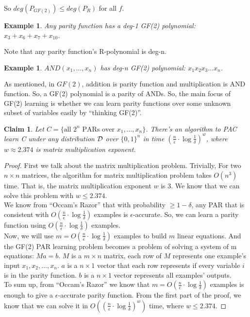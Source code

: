 \documentclass[12pt]{article}
\newtheorem{claim}[theorem]{Claim}
\newtheorem{example}[theorem]{Example}
\newcommand{\cald}{{\cal D}}
\begin{document}
So $deg(P_{GF(2)}) \le deg(P_R)$ for all $f$. \\

\begin{example}
Any parity function has a deg-1 GF(2) polynomial: $ x_3 + x_6 + x_7 +
x_{10}$.
\end{example}

Note that any parity function's R-polynomial is deg-n. 

\begin{example}
$AND(x_1,...,x_n)$ has deg-n GF(2) polynomial: $x_1x_2x_3...x_n$.
\end{example}

As mentioned, in $GF(2)$, addition is parity function and
multiplication is AND function. So, a GF(2) polynomial is a parity of
ANDs. So, the main focus of GF(2) learning is whether we can 
learn parity functions over some unknown subset of variables easily by
``thinking GF(2)''.

\begin{claim}
Let $C = \{ \text {all } 2^n \text { PARs over } x_1,...,x_n
\}$. There's an algorithm to PAC learn C under any distribution $\cald$
over $\{ 0, 1\}^n$ in time $(\frac {n}{\epsilon} \cdot \log {\frac
  {1}{\delta}})^w$, where $w \approx 2.374$ is matrix multiplication
exponent.
\end{claim}

\begin{proof}
First we talk about the matrix multiplication problem. Trivially,
For two $n \times n$ matrices, the algorithm for matrix multiplication
problem takes $O(n^3)$ time. That is, the matrix multiplication
exponent $w$ is 3. We know that we can solve this problem with $w \le
2.374$. \\

We know from ``Occam's Razor'' that with  probability $\ge 1 -
\delta$, any PAR that is consistent with $O(\frac {n}{\epsilon} \cdot
\log {\frac {1}{\delta}})$ examples is $\epsilon$-accurate. So, we
can learn a parity function using $O(\frac {n}{\epsilon} \cdot \log
{\frac {1}{\delta}})$ examples. \\

Now, we will use $m = O(\frac {n}{\epsilon} \cdot \log {\frac
  {1}{\delta}})$ examples to build $m$ linear equations. And the GF(2)
PAR learning problem becomes a problem of solving a system of m
equations: $Ma = b$. $M$ is a $m \times n$ matrix, each row of $M$
represents one example's input $x_1, x_2, ..., x_n$. $a$ is a $n
\times 1$ vector that each row represents if every variable $i$ is in
the parity function. $b$ is a $n \times 1$ vector represents all
examples' outputs. \\

To sum up, from ``Occam's Razor'' we know that $m = O(\frac
{n}{\epsilon} \cdot \log {\frac {1}{\delta}})$ examples is enough to
give a $\epsilon$-accurate parity function. From the first part of the
proof, we know that we can solve it in $O((\frac {n}{\epsilon} \cdot
\log {\frac {1}{\delta}})^w)$ time, where $w \le 2.374$. 
\end{proof}
\end{document}

